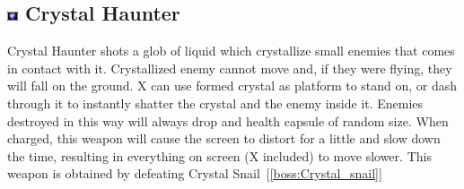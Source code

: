 \subsection{\includegraphics[width=12px, height=10px]{figures/X2/weapons/C_haunter.png} Crystal Haunter}\label{Crystal_haunter}
Crystal Haunter shots a glob of liquid which crystallize small enemies that comes in contact with it. Crystallized enemy cannot move and, if they were flying, they will fall on the ground. X can use formed crystal as platform to stand on, or dash through it to instantly shatter the crystal and the enemy inside it. Enemies destroyed in this way will always drop and health capsule of random size. When charged, this weapon will cause the screen to distort for a little and slow down the time, resulting in everything on screen (X included) to move slower. This weapon is obtained by defeating Crystal Snail~[\ref{boss:Crystal_snail}]

